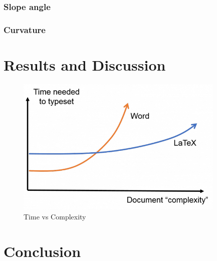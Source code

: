 \documentclass[10pt]{article}
\begin{document}
\subsubsection{Slope angle}
\subsubsection{Curvature}

\section{Results and Discussion}

\begin{figure}
  \centering
    \includegraphics[width=10cm]{myplot1}
  \caption{Time vs Complexity}
\end{figure}

\section{Conclusion}
\end{document}
